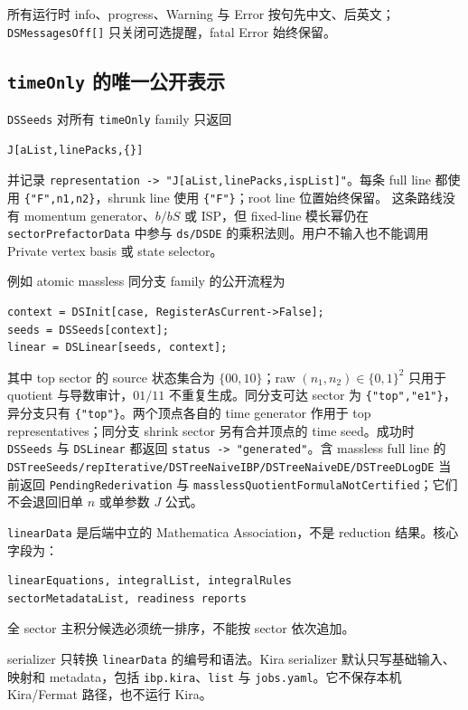 ﻿\documentclass[a4paper,11pt]{article}
\begin{document}
所有运行时 info、progress、Warning 与 Error 按句先中文、后英文；
\texttt{DSMessagesOff[]} 只关闭可选提醒，fatal Error 始终保留。

\subsection{\texttt{timeOnly} 的唯一公开表示}
\label{sec:timeOnlyRepresentations}

\texttt{DSSeeds} 对所有 \texttt{timeOnly} family 只返回
\begin{verbatim}
J[aList,linePacks,{}]
\end{verbatim}
并记录 \texttt{representation -> "J[aList,linePacks,ispList]"}。每条 full line 都使用
\texttt{\{"F",n1,n2\}}，shrunk line 使用 \texttt{\{"F"\}}；root line 位置始终保留。
这条路线没有 momentum generator、$b/bS$ 或 ISP，但 fixed-line 模长幂仍在
\texttt{sectorPrefactorData} 中参与 \texttt{ds/DSDE} 的乘积法则。用户不输入也不能调用
Private vertex basis 或 state selector。

例如 atomic massless 同分支 family 的公开流程为
\begin{verbatim}
context = DSInit[case, RegisterAsCurrent->False];
seeds = DSSeeds[context];
linear = DSLinear[seeds, context];
\end{verbatim}
其中 top sector 的 source 状态集合为 $\{00,10\}$；raw $(n_1,n_2)\in\{0,1\}^2$ 只用于 quotient 与导数审计，$01/11$ 不重复生成。同分支可达 sector 为 \texttt{\{"top","e1"\}}，异分支只有 \texttt{\{"top"\}}。两个顶点各自的 time generator 作用于 top representatives；同分支 shrink sector 另有合并顶点的 time seed。成功时 \texttt{DSSeeds} 与 \texttt{DSLinear} 都返回 \texttt{status -> "generated"}。含 massless full line 的 \texttt{DSTreeSeeds/repIterative/DSTreeNaiveIBP/DSTreeNaiveDE/DSTreeDLogDE} 当前返回 \texttt{PendingRederivation} 与 \texttt{masslessQuotientFormulaNotCertified}；它们不会退回旧单 $n$ 或单参数 $J$ 公式。

\texttt{linearData} 是后端中立的 Mathematica Association，不是 reduction 结果。核心字段为：
\begin{verbatim}
linearEquations, integralList, integralRules
sectorMetadataList, readiness reports
\end{verbatim}
全 sector 主积分候选必须统一排序，不能按 sector 依次追加。

serializer 只转换 \texttt{linearData} 的编号和语法。Kira serializer 默认只写基础输入、映射和 metadata，包括 \texttt{ibp.kira}、\texttt{list} 与 \texttt{jobs.yaml}。它不保存本机 Kira/Fermat 路径，也不运行 Kira。
\end{document}
